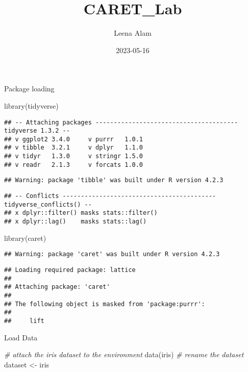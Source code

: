 \documentclass[
]{article}
\title{CARET\_Lab}
\author{Leena Alam}
\date{2023-05-16}
\newenvironment{Shaded}{\begin{snugshade}}{\end{snugshade}}
\newcommand{\CommentTok}[1]{\textcolor[rgb]{0.56,0.35,0.01}{\textit{#1}}}
\newcommand{\FunctionTok}[1]{\textcolor[rgb]{0.00,0.00,0.00}{#1}}
\newcommand{\NormalTok}[1]{#1}
\newcommand{\OtherTok}[1]{\textcolor[rgb]{0.56,0.35,0.01}{#1}}
\begin{document}
\maketitle

Package loading

\begin{Shaded}
\begin{Highlighting}[]
\FunctionTok{library}\NormalTok{(tidyverse)}
\end{Highlighting}
\end{Shaded}

\begin{verbatim}
## -- Attaching packages --------------------------------------- tidyverse 1.3.2 --
## v ggplot2 3.4.0     v purrr   1.0.1
## v tibble  3.2.1     v dplyr   1.1.0
## v tidyr   1.3.0     v stringr 1.5.0
## v readr   2.1.3     v forcats 1.0.0
\end{verbatim}

\begin{verbatim}
## Warning: package 'tibble' was built under R version 4.2.3
\end{verbatim}

\begin{verbatim}
## -- Conflicts ------------------------------------------ tidyverse_conflicts() --
## x dplyr::filter() masks stats::filter()
## x dplyr::lag()    masks stats::lag()
\end{verbatim}

\begin{Shaded}
\begin{Highlighting}[]
\FunctionTok{library}\NormalTok{(caret)}
\end{Highlighting}
\end{Shaded}

\begin{verbatim}
## Warning: package 'caret' was built under R version 4.2.3
\end{verbatim}

\begin{verbatim}
## Loading required package: lattice
## 
## Attaching package: 'caret'
## 
## The following object is masked from 'package:purrr':
## 
##     lift
\end{verbatim}

Load Data

\begin{Shaded}
\begin{Highlighting}[]
\CommentTok{\# attach the iris dataset to the environment}
\FunctionTok{data}\NormalTok{(iris)}
\CommentTok{\# rename the dataset}
\NormalTok{dataset }\OtherTok{\textless{}{-}}\NormalTok{ iris}
\end{Highlighting}
\end{Shaded}
\end{document}
